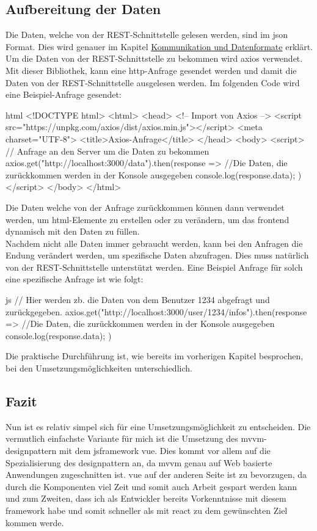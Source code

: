 \subsection{Aufbereitung der Daten}
Die Daten, welche von der REST-Schnittstelle gelesen werden, sind im \Gls{json} Format. Dies wird genauer im Kapitel \hyperref[sec:json]{Kommunikation und Datenformate} erklärt. Um die Daten von der REST-Schnittstelle zu bekommen wird \Gls{axios} verwendet. Mit dieser Bibliothek, kann eine \Gls{http}-Anfrage gesendet werden und damit die Daten von der REST-Schnittstelle ausgelesen werden. Im folgenden Code wird eine Beispiel-Anfrage gesendet:
\begin{code}{html}
	<!DOCTYPE html>
	<html>
		<head>
			<!-- Import von Axios -->
			<script src="https://unpkg.com/axios/dist/axios.min.js"></script>
			<meta charset="UTF-8">
			<title>Axios-Anfrage</title>
		</head>
		<body>
			<script>
				// Anfrage an den Server um die Daten zu bekommen
				axios.get("http://localhost:3000/data").then(response => {
					//Die Daten, die zurückkommen werden in der Konsole ausgegeben
					console.log(response.data);
				})
			</script>
		</body>
	</html>
\end{code}
Die Daten welche von der Anfrage zurückkommen können dann verwendet werden, um \Gls{html}-Elemente zu erstellen oder zu verändern, um das \Gls{frontend} dynamisch mit den Daten zu füllen.\\Nachdem nicht alle Daten immer gebraucht werden, kann bei den Anfragen die Endung verändert werden, um spezifische Daten abzufragen. Dies muss natürlich von der REST-Schnittstelle unterstützt werden. Eine Beispiel Anfrage für solch eine spezifische Anfrage ist wie folgt:
\begin{code}{js}
	// Hier werden zb. die Daten von dem Benutzer 1234 abgefragt und zurückgegeben.
	axios.get("http://localhost:3000/user/1234/infos").then(response => {
		//Die Daten, die zurückkommen werden in der Konsole ausgegeben
		console.log(response.data);
	})
\end{code}

Die praktische Durchführung ist, wie bereits im vorherigen Kapitel besprochen, bei den Umsetzungsmöglichkeiten unterschiedlich.

\subsection{Fazit}
Nun ist es relativ simpel sich für eine Umsetzungsmöglichkeit zu entscheiden. Die vermutlich einfachste Variante für mich ist die Umsetzung des \Gls{mvvm}-\Gls{designpattern} mit dem \Gls{jsframework} \Gls{vue}. Dies kommt vor allem auf die Spezialisierung des \Gls{designpattern} an, da \Gls{mvvm} genau auf Web basierte Anwendungen zugeschnitten ist. \Gls{vue} auf der anderen Seite ist zu bevorzugen, da durch die Komponenten viel Zeit und somit auch Arbeit gespart werden kann und zum Zweiten, dass ich als Entwickler bereits Vorkenntnisse mit diesem \Gls{framework} habe und somit schneller als mit \Gls{react} zu dem gewünschten Ziel kommen werde.
